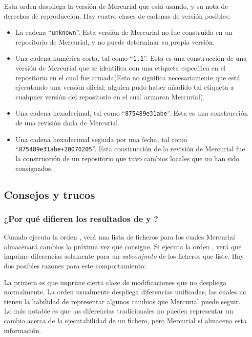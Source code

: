 

Esta orden despliega la versión de Mercurial que está usando, y su
nota de derechos de reproducción.  Hay cuatro clases de cadenas de
versión posibles:
\begin{itemize}
\item La cadena ``\texttt{unknown}''. Esta versión de Mercurial no fue
  construida en un repositorio de Mercurial, y no puede determinar su
  propia versión.
\item Una cadena numérica corta, tal como ``\texttt{1.1}''. Esta es
  una construcción de una versión de Mercurial que se identifica con
  una etiqueta específica en el repositorio en el cual fue
  armada(Esto no significa necesariamente que está ejecutando una
  versión oficial; alguien pudo haber añadido tal etiqueta a cualquier
  versión del repositorio en el cual armaron Mercurial).
\item Una cadena hexadecimal, tal como ``\texttt{875489e31abe}''.
  Esta es una construcción de una revisión dada de Mercurial.
\item Una cadena hexadecimal seguida por una fecha, tal como
  ``\texttt{875489e31abe+20070205}''.  Esta construcción de la
  revisión de Mercurial fue la construcción de un repositorio que tuvo
  cambios locales que no han sido consignados.
\end{itemize}

\subsection{Consejos y trucos}

\subsubsection{¿Por qué difieren los resultados de  y
  ?}
\label{cmdref:diff-vs-status}

Cuando ejecuta la orden , verá una lista de ficheros
para los cuales Mercurial almacenará cambios la próxima vez que
consigne.  Si ejecuta la orden , verá que imprime
diferencias solamente para un \emph{subconjunto} de los ficheros que
 liste.  Hay dos posibles razones para este comportamiento:

La primera es que  imprime cierta clase de
modificaciones que  no despliega normalmente.  La orden
 usualmente despliega diferencias unificadas, las cuales
no tienen la habilidad de representar algunos cambios que Mercurial
puede seguir.  Lo más notable es que las diferencias tradicionales no
pueden representar un cambio acerca de la ejecutabilidad de un
fichero, pero Mercurial sí almacena esta información.


